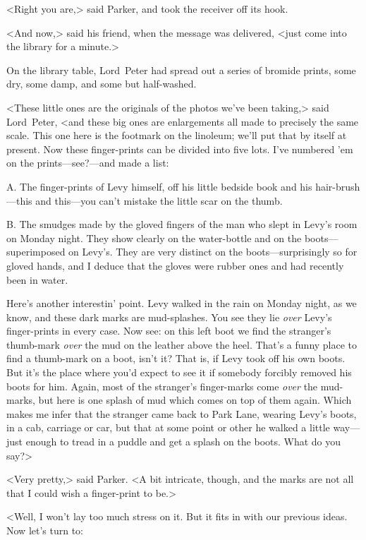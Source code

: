 <Right you are,> said Parker, and took the receiver off its hook.

<And now,> said his friend, when the message was delivered, <just come into the library for a minute.>

On the library table, Lord~Peter had spread out a series of bromide prints, some dry, some damp, and some but half-washed.

<These little ones are the originals of the photos we've been taking,> said Lord~Peter, <and these big ones are enlargements all made to precisely the same scale. This one here is the footmark on the linoleum; we'll put that by itself at present. Now these finger-prints can be divided into five lots. I've numbered 'em on the prints—see?—and made a list:

\textsc{A\@.} The finger-prints of Levy himself, off his little bedside book and his hair-brush—this and this—you can't mistake the little scar on the thumb.

\textsc{B\@.} The smudges made by the gloved fingers of the man who slept in Levy's room on Monday night. They show clearly on the water-bottle and on the boots—superimposed on Levy's. They are very distinct on the boots—surprisingly so for gloved hands, and I deduce that the gloves were rubber ones and had recently been in water.

Here's another interestin' point. Levy walked in the rain on Monday night, as we know, and these dark marks are mud-splashes. You see they lie \textit{over} Levy's finger-prints in every case. Now see: on this left boot we find the stranger's thumb-mark \textit{over} the mud on the leather above the heel. That's a funny place to find a thumb-mark on a boot, isn't it? That is, if Levy took off his own boots. But it's the place where you'd expect to see it if somebody forcibly removed his boots for him. Again, most of the stranger's finger-marks come \textit{over} the mud-marks, but here is one splash of mud which comes on top of them again. Which makes me infer that the stranger came back to Park Lane, wearing Levy's boots, in a cab, carriage or car, but that at some point or other he walked a little way—just enough to tread in a puddle and get a splash on the boots. What do you say?>

<Very pretty,> said Parker. <A bit intricate, though, and the marks are not all that I could wish a finger-print to be.>

<Well, I won't lay too much stress on it. But it fits in with our previous ideas. Now let's turn to:

